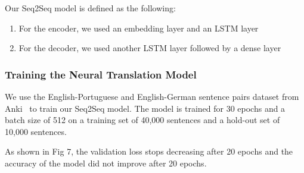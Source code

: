 \documentclass[runningheads]{llncs}
\begin{document}
	Our Seq2Seq model is defined as the following:
	
	\begin{enumerate}
		\item For the encoder, we used an embedding layer and an LSTM layer
		\item For the decoder, we used another LSTM layer followed by a dense layer
	\end{enumerate}
	
	\begin{minipage}{\linewidth}
		\begin{center}
			\hspace*{-.4in}
  			 \noindent{}
			\label{fig:Model Architectture}
		\end{center}
	\end{minipage}
	\afterpage{\clearpage}
	
	\subsubsection{Training the Neural Translation Model}
	\hfill
	\hfill
	\newline
	\newline
	We use the English-Portuguese and English-German sentence pairs dataset from Anki~\cite{ref_url13}  to train our Seq2Seq model.
	The model is trained for 30 epochs and a batch size of 512 on a training set of 40,000 sentences and a hold-out set of 10,000 sentences.   
		
	As shown in Fig 7, the validation loss stops decreasing after 20 epochs and the accuracy of the model did not improve after 20 epochs.
	
\end{document}

